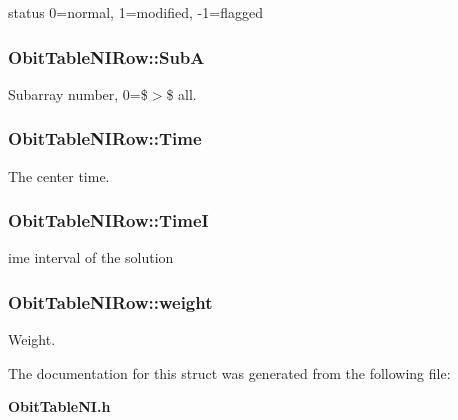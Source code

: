 status 0=normal, 1=modified, -1=flagged 

\subsubsection{ {\bf Obit\-Table\-NIRow::Sub\-A}}\label{structObitTableNIRow_o10}


Subarray number, 0=\$$>$\$ all. 

\subsubsection{ {\bf Obit\-Table\-NIRow::Time}}\label{structObitTableNIRow_o6}


The center time. 

\subsubsection{ {\bf Obit\-Table\-NIRow::Time\-I}}\label{structObitTableNIRow_o7}


ime interval of the solution 

\subsubsection{ {\bf Obit\-Table\-NIRow::weight}}\label{structObitTableNIRow_o11}


Weight. 



The documentation for this struct was generated from the following file:\begin{CompactItemize}
\item 
{\bf Obit\-Table\-NI.h}\end{CompactItemize}
